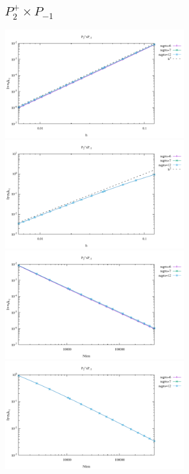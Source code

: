 \newpage
\subsection*{$P_2^+\times P_{-1}$}
\begin{center}
\includegraphics[width=8cm]{python_codes/fieldstone_120/results/P2+P-1-velocity-h.pdf}
\includegraphics[width=8cm]{python_codes/fieldstone_120/results/P2+P-1-pressure-h.pdf}
\includegraphics[width=8cm]{python_codes/fieldstone_120/results/P2+P-1-velocity-Nfem.pdf}
\includegraphics[width=8cm]{python_codes/fieldstone_120/results/P2+P-1-pressure-Nfem.pdf}
\end{center}

